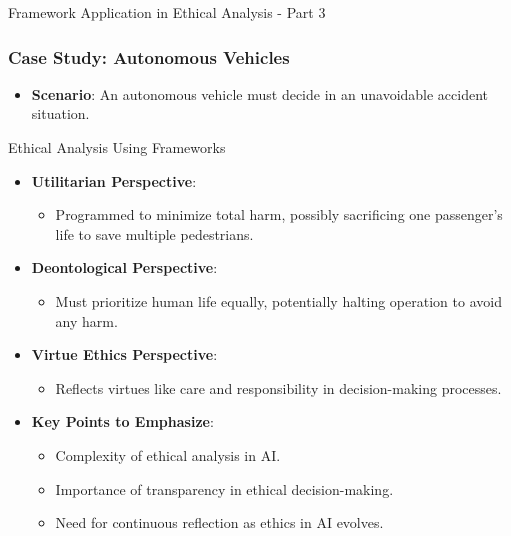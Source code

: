 \documentclass[aspectratio=169]{beamer}
\begin{document}
\begin{frame}[fragile]{Framework Application in Ethical Analysis - Part 3}
    \frametitle{Case Study: Autonomous Vehicles}
    \begin{itemize}
        \item \textbf{Scenario}: An autonomous vehicle must decide in an unavoidable accident situation.
    \end{itemize}
    
    \begin{block}{Ethical Analysis Using Frameworks}
        \begin{itemize}
            \item \textbf{Utilitarian Perspective}: 
                \begin{itemize}
                    \item Programmed to minimize total harm, possibly sacrificing one passenger’s life to save multiple pedestrians.
                \end{itemize}
            \item \textbf{Deontological Perspective}: 
                \begin{itemize}
                    \item Must prioritize human life equally, potentially halting operation to avoid any harm.
                \end{itemize}
            \item \textbf{Virtue Ethics Perspective}: 
                \begin{itemize}
                    \item Reflects virtues like care and responsibility in decision-making processes.
                \end{itemize}
        \end{itemize}
    \end{block}
    
    \begin{itemize}
        \item \textbf{Key Points to Emphasize}:
            \begin{itemize}
                \item Complexity of ethical analysis in AI.
                \item Importance of transparency in ethical decision-making.
                \item Need for continuous reflection as ethics in AI evolves.
            \end{itemize}
    \end{itemize}
\end{frame}
\end{document}
